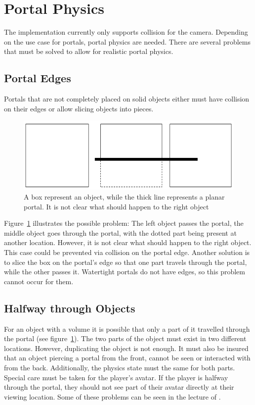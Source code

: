 \section{Portal Physics}
\label{section:portalphysics}
The implementation currently only supports collision for the camera. Depending on the use case for portals, portal physics are needed. There are several problems that must be solved to allow for realistic portal physics.

\subsection{Portal Edges}
Portals that are not completely placed on solid objects either must have collision on their edges or allow slicing objects into pieces.

\begin{figure}[h]
	\centering
	\includegraphics[width=\linewidth]{images/edgecollision.png}
	\caption{A box represent an object, while the thick line represents a planar portal. It is not clear what should happen to the right object}
	\label{fig:edgecollision}
\end{figure}

Figure~\ref{fig:edgecollision} illustrates the possible problem: The left object passes the portal, the middle object goes through the portal, with the dotted part being present at another location. However, it is not clear what should happen to the right object. This case could be prevented via collision on the portal edge. Another solution is to slice the box on the portal's edge so that one part travels through the portal, while the other passes it. Watertight portals do not have edges, so this problem cannot occur for them.

\subsection{Halfway through Objects}
For an object with a volume it is possible that only a part of it travelled through the portal (see figure~\ref{fig:edgecollision}). The two parts of the object must exist in two different locations. However, duplicating the object is not enough. It must also be insured that an object piercing a portal from the front, cannot be seen or interacted with from the back. Additionally, the physics state must the same for both parts. Special care must be taken for the player's avatar. If the player is halfway through the portal, they should not see part of their avatar directly at their viewing location. Some of these problems can be seen in the lecture of \textcite{lecture:portalProblems}.


